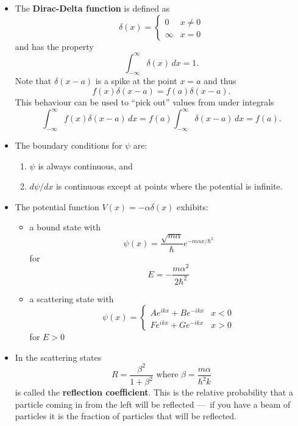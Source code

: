 \documentclass{article}
\begin{document}
\begin{itemize}
  \item The \textbf{Dirac-Delta function} is defined as \[\delta(x) = \begin{cases}
            0      & x \ne 0 \\
            \infty & x = 0
          \end{cases}\] and has the property \[\int_{-\infty}^\infty \delta(x) \,d x = 1.\] Note that $\delta(x - a)$ is a spike at the point $x = a$ and thus \[f(x) \delta(x - a) = f(a) \delta(x - a).\] This behaviour can be used to ``pick out'' values from under integrals \[\int_{-\infty}^\infty f(x) \delta(x - a) \,d x = f(a) \int_{-\infty}^\infty \delta(x - a) \,d x = f(a).\]

  \item The boundary conditions for $\psi$ are:

        \begin{enumerate}
          \item $\psi$ is always continuous, and

          \item $d \psi / d x$ is continuous except at points where the potential is infinite.
        \end{enumerate}

  \item The potential function $V(x) = -\alpha \delta(x)$ exhibits:

        \begin{itemize}
          \item a bound state with \[\psi(x) = \frac{\sqrt{m \alpha}}{\hbar} e^{-m \alpha x / \hbar^2}\] for \[E = -\frac{m \alpha^2}{2 \hbar^2}\]

          \item a scattering state with \[\psi(x) = \begin{cases}
                    A e^{i k x} + B e^{-i k x} & x < 0 \\
                    F e^{i k x} + G e^{-i k x} & x > 0
                  \end{cases}\] for $E > 0$
        \end{itemize}

  \item In the scattering states \[R = \frac{\beta^2}{1 + \beta^2} \text{ where } \beta = \frac{m \alpha}{\hbar^2 k}\] is called the \textbf{reflection coefficient}. This is the relative probability that a particle coming in from the left will be reflected — if you have a beam of particles it is the fraction of particles that will be reflected.


\end{itemize}
\end{document}
